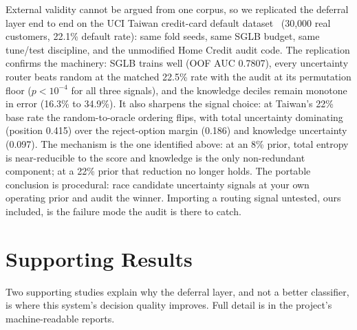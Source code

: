 \documentclass[conference]{IEEEtran}
\begin{document}
External validity cannot be argued from one corpus, so we replicated the
deferral layer end to end on the UCI Taiwan credit-card default
dataset~\cite{yeh2009} (30{,}000 real customers, 22.1\% default rate): same
fold seeds, same SGLB budget, same tune/test discipline, and the unmodified
Home Credit audit code. The replication confirms the machinery: SGLB trains
well (OOF AUC 0.7807), every uncertainty router beats random at the matched
22.5\% rate with the audit at its permutation floor ($p < 10^{-4}$ for all
three signals), and the knowledge deciles remain monotone in error (16.3\%
to 34.9\%). It also sharpens the signal choice: at Taiwan's 22\% base rate
the random-to-oracle ordering flips, with total uncertainty dominating
(position 0.415) over the reject-option margin (0.186) and knowledge
uncertainty (0.097). The mechanism is the one identified above: at an 8\%
prior, total entropy is near-reducible to the score and knowledge is the
only non-redundant component; at a 22\% prior that reduction no longer
holds. The portable conclusion is procedural: race candidate uncertainty
signals at your own operating prior and audit the winner. Importing a
routing signal untested, ours included, is the failure mode the audit is
there to catch.

\section{Supporting Results}\label{sec:results}
Two supporting studies explain why the deferral layer, and not a better
classifier, is where this system's decision quality improves. Full detail
is in the project's machine-readable reports.
\end{document}
